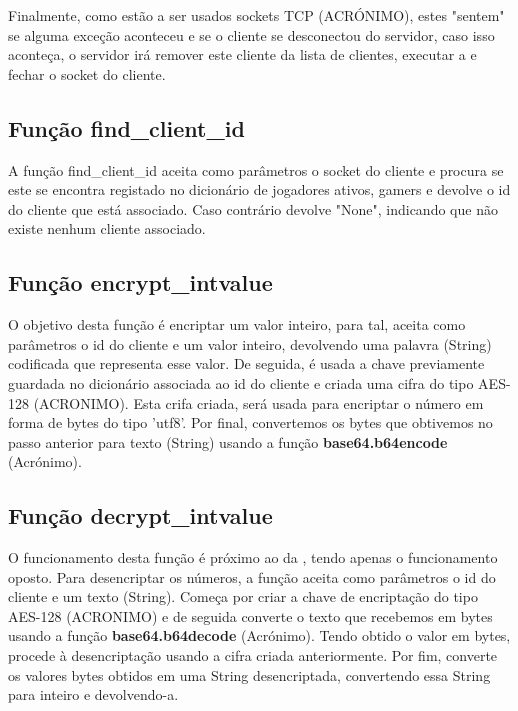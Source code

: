 \documentclass{report}
\begin{document}
Finalmente, como estão a ser usados sockets TCP (ACRÓNIMO), estes "sentem" se alguma exceção aconteceu e se o cliente se desconectou do servidor, caso isso aconteça, o servidor irá remover este cliente da lista de clientes, executar a  e fechar o socket do cliente.


\subsection{Função find\_client\_id}
\label{ssec:func_find_client_id}

A função find\_client\_id aceita como parâmetros o socket do cliente e procura se este se encontra registado no dicionário de jogadores ativos, gamers e devolve o id do cliente que está associado. Caso contrário devolve "None", indicando que não existe nenhum cliente associado.

\subsection{Função encrypt\_intvalue}
\label{ssec:func_encrypt_value_server}

O objetivo desta função é encriptar um valor inteiro, para tal, aceita como parâmetros o id do cliente e um valor inteiro, devolvendo uma palavra (String) codificada que representa esse valor. De seguida, é usada a chave previamente guardada no dicionário associada ao id do cliente e criada uma cifra do tipo AES-128 (ACRONIMO). Esta crifa criada, será usada para encriptar o número em forma de bytes do tipo 'utf8'. Por final, convertemos os bytes que obtivemos no passo anterior para texto (String) usando a função \textbf{base64.b64encode} (Acrónimo).

\subsection{Função decrypt\_intvalue}
\label{ssec:func_decrypt_value_server}

O funcionamento desta função é próximo ao da , tendo apenas o funcionamento oposto. Para desencriptar os números, a função aceita como parâmetros o id do cliente e um texto (String). Começa por criar a chave de encriptação do tipo AES-128 (ACRONIMO) e de seguida converte o texto que recebemos em bytes usando a função \textbf{base64.b64decode} (Acrónimo). Tendo obtido o valor em bytes, procede à desencriptação usando a cifra criada anteriormente. Por fim, converte os valores bytes obtidos em uma String desencriptada, convertendo essa String para inteiro e devolvendo-a.
\end{document}
